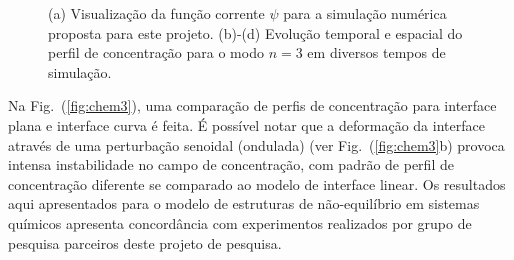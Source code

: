 \documentclass[a4paper,portuges,12pt]{article}
\begin{document}
\begin{figure}[ht!]
\begin{center}
 		\hspace{0.7cm}
 	\end{center}
	\caption{(a) Visualização da função corrente $\psi$ para a simulação
	numérica proposta para este projeto. (b)-(d) Evolução temporal e
	espacial do perfil de concentração para o modo $n=3$ em diversos
	tempos de simulação.} 
	\label{fig:chem2} 
 \end{figure}

Na Fig.~(\ref{fig:chem3}), uma comparação de perfis de concentração para
interface plana e interface curva é feita. É possível notar que a
deformação da interface através de uma perturbação senoidal (ondulada)
(ver Fig.~(\ref{fig:chem3}b) provoca intensa instabilidade no campo de
concentração, com padrão de perfil de concentração diferente se
comparado ao modelo de interface linear. Os resultados aqui apresentados
para o modelo de estruturas de não-equilíbrio em sistemas químicos
apresenta concordância com experimentos realizados por grupo de pesquisa
parceiros deste projeto de pesquisa.
\end{document}
